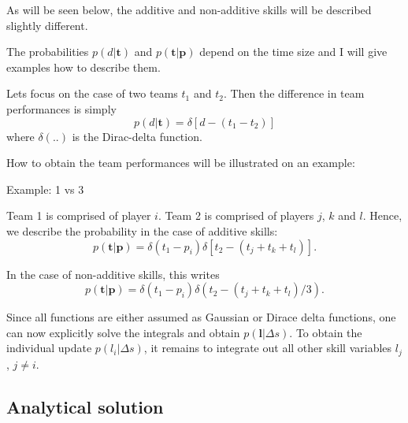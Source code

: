 \documentclass{article}
\begin{document}
As will be seen below, the additive and non-additive skills will be described slightly different. 

The probabilities $ p(d | \mathbf{t} )$ and $ p(\mathbf{t} | \mathbf{p} )$ depend on the time size and I will give examples how to describe them. 

Lets focus on the case of two teams $t_1$ and $t_2$. Then the difference in team performances is simply
\begin{equation}
p(d | \mathbf{t} ) = \delta[d - (t_1-t_2)]
\end{equation}
where $\delta(..)$ is the Dirac-delta function. 

How to obtain the team performances will be illustrated on an example:

Example: 1 vs 3 

Team 1 is comprised of player $i$. Team 2 is comprised of players $j$, $k$ and $l$.  Hence, we describe the probability in the case of additive skills:
\begin{equation}
p(\mathbf{t} | \mathbf{p} ) = \delta(t_1 - p_i)\delta[t_2 - (t_j + t_k + t_l)].
\end{equation}

In the case of non-additive skills, this writes 
\begin{equation}
p(\mathbf{t} | \mathbf{p} ) = \delta(t_1 - p_i)\delta(t_2 - (t_j + t_k + t_l)/3).
\end{equation}

Since all functions are either assumed as Gaussian or Dirace delta functions, one can now explicitly solve the integrals and obtain $p(\mathbf{l} | \Delta s) $. To obtain the individual update $p(l_i | \Delta s)$, it remains to integrate out all other skill variables $l_j$, $j\neq i$.


\subsection{Analytical solution}
\end{document}
